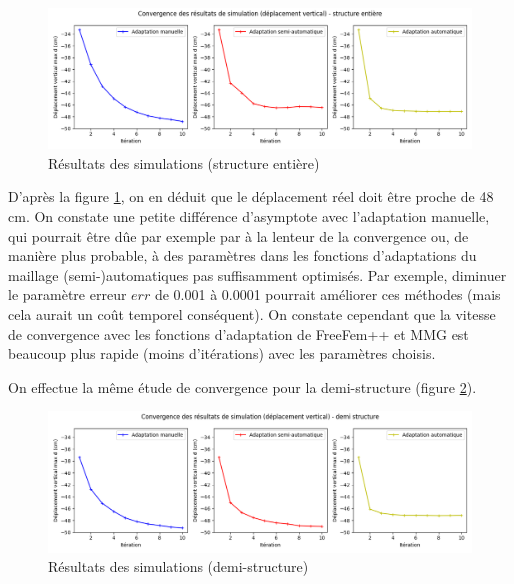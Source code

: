     \begin{figure}        
        \begin{center}
        
            \includegraphics[width=16.5cm]{imgs/cvg.png}
            \caption{Résultats des simulations (structure entière)}
            \label{fig:cvg}
        
        \end{center}
    \end{figure}

    D'après la figure \ref{fig:cvg}, on en déduit que le déplacement réel doit être proche de 48 cm. On constate une petite différence d'asymptote avec l'adaptation manuelle,
    qui pourrait être dûe par exemple par à la lenteur de la convergence ou, de manière plus probable, à des paramètres dans les fonctions d'adaptations du maillage
    (semi-)automatiques pas suffisamment optimisés. Par exemple, diminuer le paramètre erreur $err$ de 0.001 à 0.0001 pourrait améliorer ces méthodes (mais cela aurait un
    coût temporel conséquent). On constate cependant que la vitesse de convergence avec les fonctions d'adaptation de FreeFem++
    et MMG est beaucoup plus rapide (moins d'itérations) avec les paramètres choisis.

    On effectue la même étude de convergence pour la demi-structure (figure \ref{fig:h_cvg}).

    \begin{figure}        
        \begin{center}
        
            \includegraphics[width=16.5cm]{imgs/cvgH.png}
            \caption{Résultats des simulations (demi-structure)}
            \label{fig:h_cvg}
        
        \end{center}
    \end{figure}

